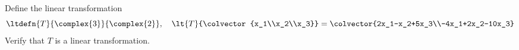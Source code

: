 Define the linear transformation
%
\begin{equation*}
\ltdefn{T}{\complex{3}}{\complex{2}},\quad
\lt{T}{\colvector{x_1\\x_2\\x_3}}=\colvector{2x_1-x_2+5x_3\\-4x_1+2x_2-10x_3}
\end{equation*}
%
Verify that $T$ is a linear transformation.